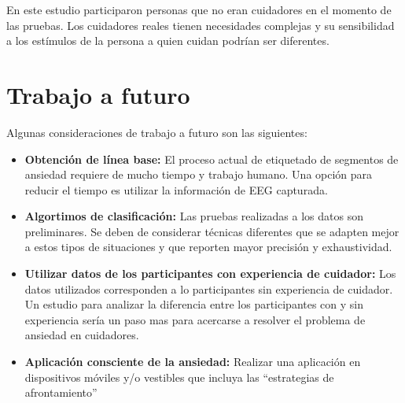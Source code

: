 	En este estudio participaron personas que no eran cuidadores en el momento de las pruebas. Los cuidadores reales tienen necesidades complejas y su sensibilidad a los est\'imulos de la persona a quien cuidan podr\'ian ser diferentes.
\section{Trabajo a futuro}
Algunas consideraciones de trabajo a futuro son las siguientes:

\begin{itemize}
	\item \textbf{Obtenci\'on de l\'inea base:} El proceso actual de etiquetado de segmentos de ansiedad requiere de mucho tiempo y trabajo humano. Una opci\'on para reducir el tiempo es utilizar la informaci\'on de EEG capturada.
	\item \textbf{Algortimos de clasificaci\'on:} Las pruebas realizadas a los datos son preliminares. Se deben de considerar t\'ecnicas diferentes que se adapten mejor a estos tipos de situaciones y que reporten mayor precisi\'on y exhaustividad.
	\item \textbf{Utilizar datos de los participantes con experiencia de cuidador:} Los datos utilizados corresponden a lo participantes sin experiencia de cuidador. Un estudio para analizar la diferencia entre los participantes con y sin experiencia ser\'ia un paso mas para acercarse a resolver el problema de ansiedad en cuidadores.
	\item \textbf{Aplicaci\'on consciente de la ansiedad:} Realizar una aplicaci\'on en dispositivos m\'oviles y/o vestibles que incluya las ``estrategias de afrontamiento''
\end{itemize}
